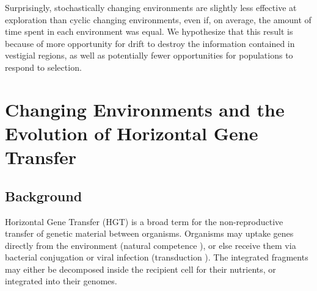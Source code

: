 \documentclass[PhD]{msu-thesis}
\begin{document}
Surprisingly, stochastically changing environments are slightly less effective at exploration
than cyclic changing environments, even if, on average, the amount of time spent in each environment was equal. We hypothesize that this result is because of more opportunity for drift to destroy the information contained in vestigial regions, as well as potentially fewer opportunities for populations to respond to selection.





\chapter{Changing Environments and the Evolution of Horizontal Gene Transfer}
\label{chap:evo-hgt}
\section{Background}

Horizontal Gene Transfer (HGT) is a broad term for the non-reproductive transfer of genetic material between organisms. Organisms may uptake genes directly from the environment (natural competence \cite{chen_dna_2004}), or else receive them via bacterial conjugation\cite{lederberg_gene_1946} or viral infection (transduction \cite{zinder_genetic_1952,lennox_transduction_1955}). The integrated fragments may either be decomposed inside the recipient cell for their nutrients, or integrated into their genomes. 
\end{document}
